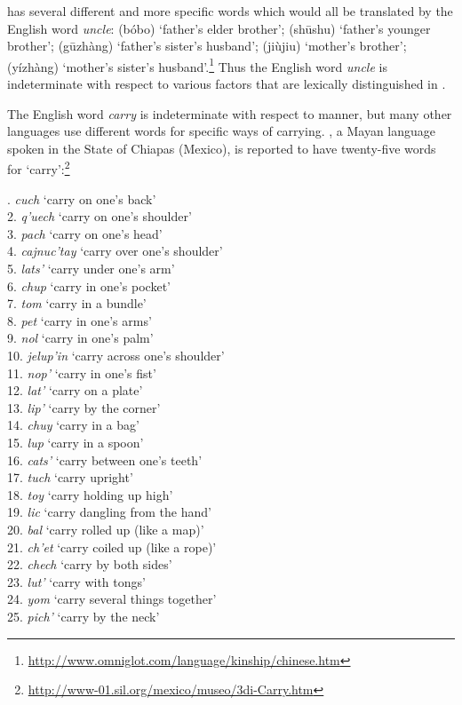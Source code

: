  has several different and more specific words which would all be translated by the English word \textit{uncle}:  (bóbo) ‘father’s elder brother’;  (sh\=ushu) ‘father’s younger brother’;  (g\=uzhàng) ‘father’s sister’s husband’;  (jiùjiu) ‘mother’s brother’;  (yízhàng) ‘mother’s sister’s husband’.\footnote{\url{http://www.omniglot.com/language/kinship/chinese.htm}}  Thus the English word \textit{uncle} is indeterminate with respect to various factors that are lexically distinguished in .



The English word \textit{carry} is indeterminate with respect to manner, but many other languages use different words for specific ways of carrying. , a Mayan language spoken in the State of Chiapas (Mexico), is reported to have twenty-five words for ‘carry’:\footnote{\url{http://www-01.sil.org/mexico/museo/3di-Carry.htm}} 


. \textit{cuch} ‘carry on one’s back’\\
2. \textit{q'uech} ‘carry on one’s shoulder’ \\
3. \textit{pach} ‘carry on one’s head’ \\
4. \textit{cajnuc'tay} ‘carry over one’s shoulder’\\
5. \textit{lats'} ‘carry under one’s arm’\\
6. \textit{chup} ‘carry in one’s pocket’\\
7. \textit{tom} ‘carry in a bundle’\\
8. \textit{pet} ‘carry in one’s arms’\\
9. \textit{nol} ‘carry in one’s palm’\\
10. \textit{jelup'in} ‘carry across one’s shoulder’\\
11. \textit{nop'} ‘carry in one’s fist’\\
12. \textit{lat'} ‘carry on a plate’\\
13. \textit{lip'} ‘carry by the corner’\\
14. \textit{chuy} ‘carry in a bag’\\
15. \textit{lup} ‘carry in a spoon’\\
16. \textit{cats'} ‘carry between one’s teeth’\\
17. \textit{tuch} ‘carry upright’\\
18. \textit{toy} ‘carry holding up high’\\
19. \textit{lic} ‘carry dangling from the hand’\\
20. \textit{bal} ‘carry rolled up (like a map)’\\
21. \textit{ch'et} ‘carry coiled up (like a rope)’\\
22. \textit{chech} ‘carry by both sides’\\
23. \textit{lut'} ‘carry with tongs’\\
24. \textit{yom} ‘carry several things together’\\
25. \textit{pich'} ‘carry by the neck’
\z


